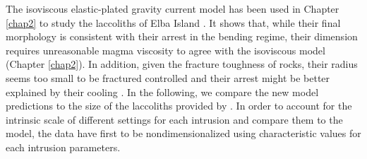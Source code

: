 The isoviscous elastic-plated  gravity current model has  been used in
Chapter   \ref{chap2}  to   study  the   laccoliths  of   Elba  Island
\citep{Michaut:2011kg}. It shows that, while their final morphology is
consistent with  their arrest in  the bending regime,  their dimension
requires  unreasonable magma  viscosity to  agree with  the isoviscous
model  (Chapter   \ref{chap2}).   In  addition,  given   the  fracture
toughness  of rocks,  their radius  seems  too small  to be  fractured
controlled and their arrest might be better explained by their cooling
\citep{Michaut:2011kg}.  In  the following,  we compare the  new model
predictions   to   the   size    of   the   laccoliths   provided   by
\citet{Rocchi:2002jy}.  In order to account for the intrinsic scale of
different settings for  each intrusion and compare them  to the model,
the  data have  first  to be  nondimensionalized using  characteristic
values for each intrusion parameters.

